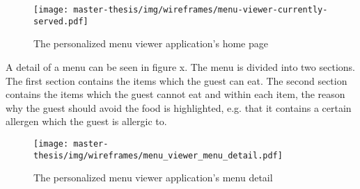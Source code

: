 \begin{figure}[h]
  \centering
  \texttt{[image: master-thesis/img/wireframes/menu-viewer-currently-served.pdf]}
  \caption{The personalized menu viewer application's home page}
\end{figure}

A detail of a menu can be seen in figure x.
The menu is divided into two sections.
The first section contains the items which the guest can eat.
The second section contains the items which the guest cannot eat and within each item, the reason why the guest should avoid the food is highlighted, e.g. that it contains a certain allergen which the guest is allergic to.

\begin{figure}[h]
  \centering
  \texttt{[image: master-thesis/img/wireframes/menu\_viewer\_menu\_detail.pdf]}
  \caption{The personalized menu viewer application's menu detail}
\end{figure}
